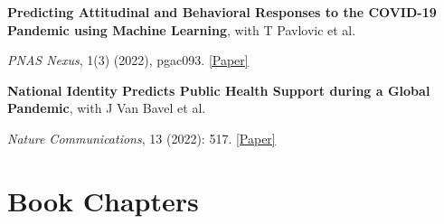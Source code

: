 \documentclass[letterpaper]{article}
\renewenvironment{itemize}{
  \begin{list}{}{
    \setlength{\leftmargin}{1.5em}
  }
}{
  \end{list}
}
\begin{document}
\medskip


\begin{itemize}
	\item \textbf{Predicting Attitudinal and Behavioral Responses to the COVID-19 Pandemic using Machine Learning}, with T Pavlovic et al. 
		\vspace{-0.05in}
\item \textit{PNAS Nexus}, 1(3) (2022), pgac093.   \href{https://doi.org/10.1093/pnasnexus/pgac093}{[Paper]}
\end{itemize}


		\medskip


\begin{itemize}
	\item \textbf{National Identity Predicts Public Health Support during a Global Pandemic}, with J Van Bavel et al. 
		\vspace{-0.05in}
\item \textit{Nature Communications}, 13 (2022): 517. \href{https://www.nature.com/articles/s41467-021-27668-9}{[Paper]}
\end{itemize}


\section*{Book Chapters}
\end{document}
